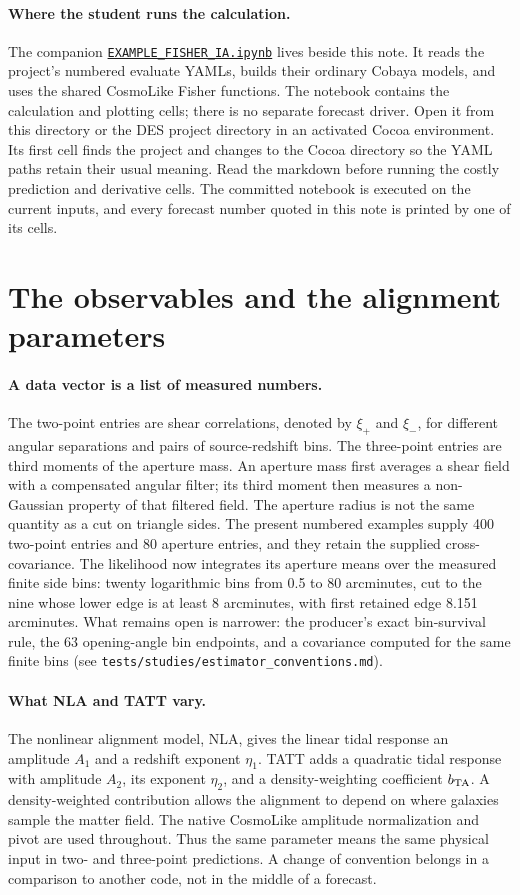 \documentclass[11pt]{article}
\newcommand{\us}{\_\allowbreak}
\begin{document}
\paragraph{Where the student runs the calculation.}
The companion
\href{EXAMPLE_FISHER_IA.ipynb}{\texttt{EXAMPLE\us FISHER\us IA.ipynb}}
lives beside this note. It reads the project's numbered evaluate YAMLs,
builds their ordinary Cobaya models, and uses the shared CosmoLike Fisher
functions. The notebook contains the calculation and plotting cells;
there is no separate forecast driver. Open it from this directory or the
DES project directory in an activated Cocoa environment. Its first cell
finds the project and changes to the Cocoa directory so the YAML paths
retain their usual meaning. Read the markdown before running the costly
prediction and derivative cells. The committed notebook is executed on the
current inputs, and every forecast number quoted in this note is printed
by one of its cells.

\section{The observables and the alignment parameters}
\paragraph{A data vector is a list of measured numbers.}
The two-point entries are shear correlations, denoted by $\xi_+$ and $\xi_-$,
for different angular separations and pairs of source-redshift bins. The
three-point entries are third moments of the aperture mass. An aperture
mass first averages a shear field with a compensated angular filter; its
third moment then measures a non-Gaussian property of that filtered field.
The aperture radius is not the same quantity as a cut on triangle sides.
The present numbered examples supply 400 two-point entries and 80 aperture
entries, and they retain the supplied cross-covariance. The likelihood now
integrates its aperture means over the measured finite side bins: twenty
logarithmic bins from 0.5 to 80 arcminutes, cut to the nine whose lower
edge is at least 8 arcminutes, with first retained edge 8.151 arcminutes.
What remains open is narrower: the producer's exact bin-survival rule, the
63 opening-angle bin endpoints, and a covariance computed for the same
finite bins (see \nolinkurl{tests/studies/estimator_conventions.md}).

\paragraph{What NLA and TATT vary.}
The nonlinear alignment model, NLA, gives the linear tidal response an
amplitude $A_1$ and a redshift exponent $\eta_1$. TATT adds a quadratic tidal
response with amplitude $A_2$, its exponent $\eta_2$, and a density-weighting
coefficient $b_{\rm TA}$. A density-weighted contribution allows the
alignment to depend on where galaxies sample the matter field. The native
CosmoLike amplitude normalization and pivot are used throughout. Thus the
same parameter means the same physical input in two- and three-point
predictions. A change of convention belongs in a comparison to another
code, not in the middle of a forecast.
\end{document}
